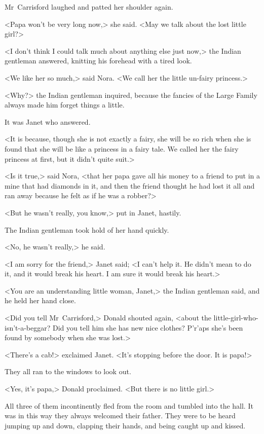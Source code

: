 Mr~Carrisford laughed and patted her shoulder again.

<Papa won't be very long now,> she said. <May we talk about the lost little girl?>

<I don't think I could talk much about anything else just now,> the Indian gentleman answered, knitting his forehead with a tired look.

<We like her so much,> said Nora. <We call her the little un-fairy princess.>

<Why?> the Indian gentleman inquired, because the fancies of the Large Family always made him forget things a little.

It was Janet who answered.

<It is because, though she is not exactly a fairy, she will be so rich when she is found that she will be like a princess in a fairy tale. We called her the fairy princess at first, but it didn't quite suit.>

<Is it true,> said Nora, <that her papa gave all his money to a friend to put in a mine that had diamonds in it, and then the friend thought he had lost it all and ran away because he felt as if he was a robber?>

<But he wasn't really, you know,> put in Janet, hastily.

The Indian gentleman took hold of her hand quickly.

<No, he wasn't really,> he said.

<I am sorry for the friend,> Janet said; <I can't help it. He didn't mean to do it, and it would break his heart. I am sure it would break his heart.>

<You are an understanding little woman, Janet,> the Indian gentleman said, and he held her hand close.

<Did you tell Mr~Carrisford,> Donald shouted again, <about the little-girl-who-isn't-a-beggar? Did you tell him she has new nice clothes? P'r'aps she's been found by somebody when she was lost.>

<There's a cab!> exclaimed Janet. <It's stopping before the door. It is papa!>

They all ran to the windows to look out.

<Yes, it's papa,> Donald proclaimed. <But there is no little girl.>

All three of them incontinently fled from the room and tumbled into the hall. It was in this way they always welcomed their father. They were to be heard jumping up and down, clapping their hands, and being caught up and kissed.

